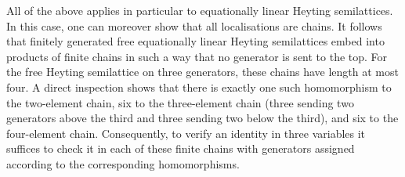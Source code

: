 \documentclass[reqno,a4paper]{amsart}
\theoremstyle{remark}
\theoremstyle{definition}
\begin{document}
All of the above applies in particular to equationally linear Heyting semilattices. In this case, one can moreover show that all localisations are chains. It follows that finitely generated free equationally linear Heyting semilattices embed into products of finite chains in such a way that no generator is sent to the top. For the free Heyting semilattice on three generators, these chains have length at most four. A direct inspection shows that there is exactly one such homomorphism to the two-element chain, six to the three-element chain (three sending two generators above the third and three sending two below the third), and six to the four-element chain. Consequently, to verify an identity in three variables it suffices to check it in each of these finite chains with generators assigned according to the corresponding homomorphisms.
\end{document}
